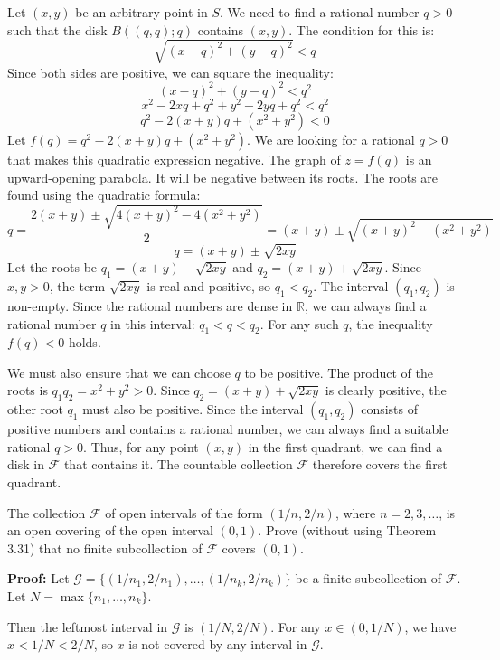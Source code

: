 Let $(x, y)$ be an arbitrary point in $S$. We need to find a rational number $q > 0$ such that the disk $B((q,q); q)$ contains $(x, y)$. The condition for this is:
$$\sqrt{(x-q)^2 + (y-q)^2} < q$$
Since both sides are positive, we can square the inequality:
$$(x-q)^2 + (y-q)^2 < q^2$$
$$x^2 - 2xq + q^2 + y^2 - 2yq + q^2 < q^2$$
$$q^2 - 2(x+y)q + (x^2+y^2) < 0$$
Let $f(q) = q^2 - 2(x+y)q + (x^2+y^2)$. We are looking for a rational $q > 0$ that makes this quadratic expression negative. The graph of $z=f(q)$ is an upward-opening parabola. It will be negative between its roots. The roots are found using the quadratic formula:
$$q = \frac{2(x+y) \pm \sqrt{4(x+y)^2 - 4(x^2+y^2)}}{2} = (x+y) \pm \sqrt{(x+y)^2 - (x^2+y^2)}$$
$$q = (x+y) \pm \sqrt{2xy}$$
Let the roots be $q_1 = (x+y) - \sqrt{2xy}$ and $q_2 = (x+y) + \sqrt{2xy}$. Since $x,y > 0$, the term $\sqrt{2xy}$ is real and positive, so $q_1 < q_2$. The interval $(q_1, q_2)$ is non-empty.
Since the rational numbers are dense in $\mathbb{R}$, we can always find a rational number $q$ in this interval: $q_1 < q < q_2$. For any such $q$, the inequality $f(q) < 0$ holds.

We must also ensure that we can choose $q$ to be positive. The product of the roots is $q_1 q_2 = x^2+y^2 > 0$. Since $q_2 = (x+y) + \sqrt{2xy}$ is clearly positive, the other root $q_1$ must also be positive.
Since the interval $(q_1, q_2)$ consists of positive numbers and contains a rational number, we can always find a suitable rational $q > 0$.
Thus, for any point $(x,y)$ in the first quadrant, we can find a disk in $\mathcal{F}$ that contains it. The countable collection $\mathcal{F}$ therefore covers the first quadrant.


\begin{problembox}
The collection \( \mathcal{F} \) of open intervals of the form \( (1/n, 2/n) \), where \( n = 2, 3, \ldots \), is an open covering of the open interval \( (0, 1) \). Prove (without using Theorem 3.31) that no finite subcollection of \( \mathcal{F} \) covers \( (0, 1) \).
\end{problembox}

\textbf{Proof:} Let $\mathcal{G} = \{(1/n_1, 2/n_1), \ldots, (1/n_k, 2/n_k)\}$ be a finite subcollection of $\mathcal{F}$. Let $N = \max\{n_1, \ldots, n_k\}$.

Then the leftmost interval in $\mathcal{G}$ is $(1/N, 2/N)$. For any $x \in (0, 1/N)$, we have $x < 1/N < 2/N$, so $x$ is not covered by any interval in $\mathcal{G}$.

